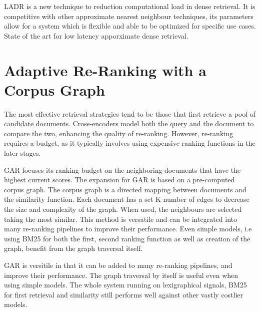 \documentclass[sigconf,authorversion,nonacm]{acmart}
\begin{document}
LADR is a new technique to reduction computational load in dense retrieval. It is competitive with
other approximate nearest neighbour techniques, its parameters allow for a system which is flexible
and able to be optimized for specific use cases. State of the art for low latency apporximate dense
retrieval.

\section{Adaptive Re-Ranking with a Corpus Graph}

The most effective retrieval strategies tend to be those that first retrieve a pool of candidate
documents. Cross-encoders model both the query and the document to compare the two, enhancing the
quality of re-ranking. However, re-ranking requires a budget, as it typically involves using
expensive ranking functions in the later stages.

GAR focuses its ranking budget on the neighboring documents that have the highest current scores.
The expansion for GAR is based on a pre-computed corpus graph. The corpus graph is a directed
mapping between documents and the similarity function. Each document has a set K number of edges to
decrease the size and complexity of the graph. When used, the neighbours are selected taking the
most similar. This method is versatile and can be integrated into many re-ranking pipelines to
improve their performance. Even simple models, i.e using BM25 for both the first, second ranking
function as well as creation of the graph, benefit from the graph traversal itself.

GAR is versitile in that it can be added to many re-ranking pipelines, and improve their
performance. The graph traversal by itself is useful even when using simple models. The whole
system running on lexigraphical signals, BM25 for first retrieval and similarity still performs
well against other vastly costlier models.
\end{document}
